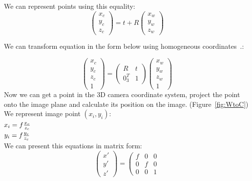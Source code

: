 \documentclass[a4paper, twoside, english]{article}
\begin{document}
{We can represent points using this equality:
\begin{equation*}
\left(
\begin{array}{ccc}
	x_c\\
	y_c\\
	z_c
\end{array}
\right) =
t +
R\left(
\begin{array}{ccc}
	x_w\\
	y_w\\
	z_w
\end{array}
\right)
\end{equation*}

We can transform equation in the form below using homogeneous coordinates~\cite{Stricker2021}.:

\begin{equation*}
	\left(
	\begin{array}{ccc}
		x_c\\
		y_c\\
		z_c\\
		1
	\end{array}
	\right) =
	\left(
	\begin{array}{ccc}
		R & t\\
		0_{3}^T & 1
	\end{array}
	\right)
	\left(
	\begin{array}{ccc}
		x_w\\
		y_w\\
		z_w\\
		1
	\end{array}
	\right) 
\end{equation*}
Now we can get a point in the 3D camera coordinate system, project the point onto the image plane and calculate its position on the image. (Figure~\ref{fig:WtoC})\\
We represent image point $(x_i,y_i)$:\\
$x_i=f{{x_c}\over{z_c}}$\\
$y_i=f{{y_c}\over{z_c}}$\\
We can present this equations in matrix form:
\begin{equation*}
\left(
\begin{array}{ccc}
	x'\\
	y'\\
	z'
\end{array}
\right) =
\left(
\begin{array}{ccc}
	f & 0 & 0\\
	0 & f & 0\\
	0 & 0& 1
\end{array}

\end{equation*}}
\end{document}
